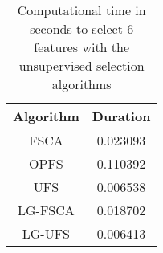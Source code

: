 \begin{table}
	\begin{center}
		\begin{tabular}{c c}
			Algorithm & Duration \\
			\hline
			FSCA & 0.023093 \\
			OPFS & 0.110392 \\
			UFS & 0.006538 \\
			LG-FSCA & 0.018702 \\
			LG-UFS & 0.006413 \\
		\end{tabular}
	\end{center}
	\caption{Computational time in seconds to select 6 features with the unsupervised selection algorithms}
\end{table}